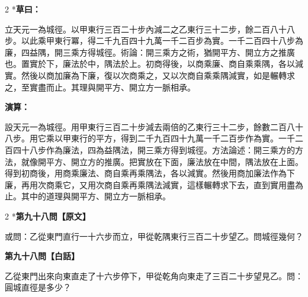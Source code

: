 \documentclass[11pt,a4paper]{article}
\begin{document}
\vspace{0.1cm}
\noindent{}
\par\vspace{0.15cm}

\begin{paracol}{2}
\switchcolumn[0]*\textbf{草曰：}

\small 立天元一為城徑。以甲東行三百二十步內減二之乙東行三十二步，餘二百八十八步。以此乘甲東行冪，得二千九百四十九萬一千二百步為實。一千二百四十八步為廉，四益隅，開三乘方得城徑。術論：開三乘方之術，猶開平方、開立方之推廣也。置實於下，廉法於中，隅法於上。初商得後，以商乘廉、商自乘乘隅，各以減實。然後以商加廉為下廉，復以次商乘之，又以次商自乘乘隅減實，如是輾轉求之，至實盡而止。其理與開平方、開立方一脈相承。

\switchcolumn\textbf{演算：}

\small 設天元一為城徑。用甲東行三百二十步減去兩倍的乙東行三十二步，餘數二百八十八步。用它乘以甲東行的平方，得到二千九百四十九萬一千二百步作為實。一千二百四十八步作為廉法，四為益隅法，開三乘方得到城徑。方法論述：開三乘方的方法，就像開平方、開立方的推廣。把實放在下面，廉法放在中間，隅法放在上面。得到初商後，用商乘廉法、商自乘再乘隅法，各以減實。然後用商加廉法作為下廉，再用次商乘它，又用次商自乘再乘隅法減實，這樣輾轉求下去，直到實用盡為止。其中的道理與開平方、開立方一脈相承。
\end{paracol}

\vspace{0.1cm}
\noindent{}
\par\vspace{0.3cm}

\begin{paracol}{2}
\switchcolumn[0]*\noindent\textbf{第九十八問【原文】}

\small 或問：乙從東門直行一十六步而立，甲從乾隅東行三百二十步望乙。問城徑幾何？

\switchcolumn\noindent\textbf{第九十八問【白話】}

\small 乙從東門出來向東直走了十六步停下，甲從乾角向東走了三百二十步望見乙。問：圓城直徑是多少？
\end{paracol}
\end{document}
